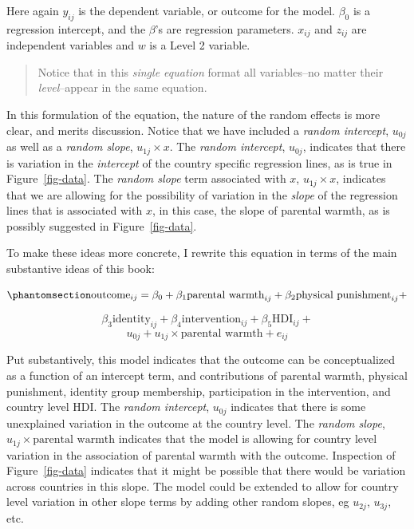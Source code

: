 \documentclass[
  letterpaper,
  DIV=11,
  numbers=noendperiod]{scrreprt}
\begin{document}
Here again \(y_{ij}\) is the dependent variable, or outcome for the
model. \(\beta_0\) is a regression intercept, and the \(\beta\)'s are
regression parameters. \(x_{ij}\) and \(z_{ij}\) are independent
variables and \(w\) is a Level 2 variable.

\begin{quote}
Notice that in this \emph{single equation} format all variables--no
matter their \emph{level}--appear in the same equation.
\end{quote}

In this formulation of the equation, the nature of the random effects is
more clear, and merits discussion. Notice that we have included a
\emph{random intercept}, \(u_{0j}\) as well as a \emph{random slope},
\(u_{1j} \times x\). The \emph{random intercept}, \(u_{0j}\), indicates
that there is variation in the \emph{intercept} of the country specific
regression lines, as is true in Figure~\ref{fig-data}. The \emph{random
slope} term associated with \(x\), \(u_{1j} \times x\), indicates that
we are allowing for the possibility of variation in the \emph{slope} of
the regression lines that is associated with \(x\), in this case, the
slope of parental warmth, as is possibly suggested in
Figure~\ref{fig-data}.

To make these ideas more concrete, I rewrite this equation in terms of
the main substantive ideas of this book:

\begin{equation}\phantomsection\label{eq-MLMsubstantive}{\text{outcome}_{ij} = \beta_0 + \beta_1 \text{parental warmth}_{ij} + \\ \beta_2 \text{physical punishment}_{ij} +}\end{equation}

\[\beta_3 \text{identity}_{ij} + \beta_4 \text{intervention}_{ij} + \beta_5 \text{HDI}_{ij} + \]
\[u_{0j} + u_{1j} \times \text{parental warmth} + e_{ij}\]

Put substantively, this model indicates that the outcome can be
conceptualized as a function of an intercept term, and contributions of
parental warmth, physical punishment, identity group membership,
participation in the intervention, and country level HDI. The
\emph{random intercept}, \(u_{0j}\) indicates that there is some
unexplained variation in the outcome at the country level. The
\emph{random slope}, \(u_{1j} \times \text{parental warmth}\) indicates
that the model is allowing for country level variation in the
association of parental warmth with the outcome. Inspection of
Figure~\ref{fig-data} indicates that it might be possible that there
would be variation across countries in this slope. The model could be
extended to allow for country level variation in other slope terms by
adding other random slopes, eg \(u_{2j}\), \(u_{3j}\), etc.
\end{document}
